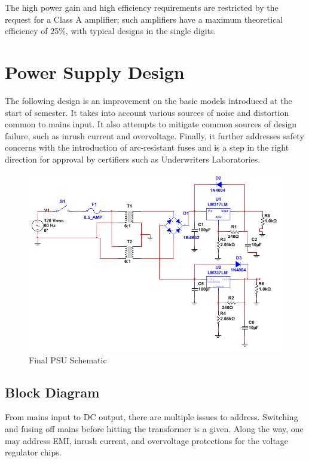 \documentclass[journal]{IEEEtran}
\begin{document}
The high power gain and high efficiency requirements are restricted by the request for a Class A amplifier; such amplifiers have a maximum theoretical efficiency of 25\%, with typical designs in the single digits.

\section{Power Supply Design}

The following design is an improvement on the basic models introduced at the start of semester. It takes into account various sources of noise and distortion common to mains input. It also attempts to mitigate common sources of design failure, such as inrush current and overvoltage. Finally, it further addresses safety concerns with the introduction of arc-resistant fuses and is a step in the right direction for approval by certifiers such as Underwriters Laboratories. 

\begin{figure}[H]
\centering
\includegraphics[scale=.36]{final-psu.png}
\caption{Final PSU Schematic}
\label{fig_psu_schem}
\end{figure}

\subsection{Block Diagram}

From mains input to DC output, there are multiple issues to address. Switching and fusing off mains before hitting the transformer is a given. Along the way, one may address EMI, inrush current, and overvoltage protections for the voltage regulator chips.
\end{document}
